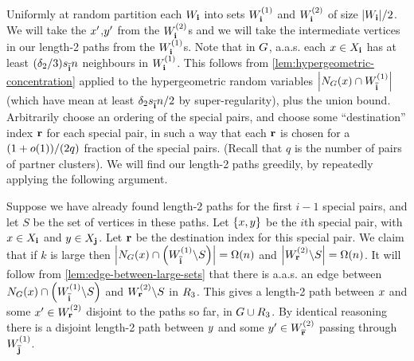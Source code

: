 \documentclass[11pt,english]{article}
\theoremstyle{plain}
\theoremstyle{plain}
\theoremstyle{plain}
\theoremstyle{plain}
\theoremstyle{plain}
\theoremstyle{definition}
\theoremstyle{definition}
\theoremstyle{remark}
\theoremstyle{remark}
\theoremstyle{plain}
\theoremstyle{definition}
\theoremstyle{definition}
\theoremstyle{plain}
\theoremstyle{plain}
\theoremstyle{plain}
\theoremstyle{plain}
\theoremstyle{remark}
\theoremstyle{plain}
\theoremstyle{definition}
\let\originalleft\left
\let\originalright\right
\renewcommand{\left}{\mathopen{}\mathclose\bgroup\originalleft}
\renewcommand{\right}{\aftergroup\egroup\originalright}
\begin{document}
Uniformly at random partition each $W_{\mathbf{i}}$ into sets $W_{\bi}^{\left(1\right)}$
and $W_{\bi}^{\left(2\right)}$ of size $\left|W_{\bi}\right|/2$.
We will take the $x'$,$y'$ from the $W_{\bi}^{\left(2\right)}$s
and we will take the intermediate vertices in our length-2 paths from
the $W_{\bi}^{\left(1\right)}$s. Note that in $G$, a.a.s. each
$x\in X_{\mathbf{i}}$ has at least $\left(\delta_{2}/3\right)s_{\flip{\bi}}n$
neighbours in $W_{\bi}^{\left(1\right)}$. This follows from \ref{lem:hypergeometric-concentration} applied to the
hypergeometric random variables $\left|N_{\G}\left(\x\right)\cap W_{\flip{\bi}}^{\left(1\right)}\right|$
(which have mean at least $\delta_{2}s_{\overline{\mathbf{i}}}n/2$ by super-regularity),
plus the union bound. Arbitrarily choose an ordering of the special
pairs, and choose some ``destination'' index $\mathbf{r}$ for each special
pair, in such a way that each $\mathbf{r}$ is chosen for a $\left(1+o\left(1\right)\right)/\left(2q\right)$
fraction of the special pairs. (Recall that $q$ is the number of
pairs of partner clusters). We will find our length-2 paths greedily,
by repeatedly applying the following argument.

Suppose we have already found length-2 paths for the first $i-1$
special pairs, and let $S$ be the set of vertices in these paths.
Let $\left\{ \x,\y\right\} $ be the $i$th special pair, with $x\in X_{\mathbf{i}}$
and $y\in X_{\mathbf{j}}$. Let $\mathbf{r}$ be the destination index for this
special pair. We claim that if $k$ is large then $\left|N_{\G}\left(\x\right)\cap\left(W_{\flip{\bi}}^{\left(1\right)}\backslash S\right)\right|=\Omega\left(n\right)$
and $\left|W_{\br}^{\left(2\right)}\backslash S\right|=\Omega\left(n\right)$.
It will follow from \ref{lem:edge-between-large-sets} that there
is a.a.s. an edge between $N_{\G}\left(\x\right)\cap\left(W_{\flip{\bi}}^{\left(1\right)}\backslash S\right)$
and $W_{\br}^{\left(2\right)}\backslash S$ in $R_{3}$. This gives
a length-2 path between $x$ and some $\x'\in W_{\br}^{\left(2\right)}$
disjoint to the paths so far, in $G\cup R_{3}$. By identical reasoning
there is a disjoint length-2 path between $y$ and some $\y'\in W_{\flip{\br}}^{\left(2\right)}$
passing through $W_{\flip{\bj}}^{\left(1\right)}$.
\end{document}
